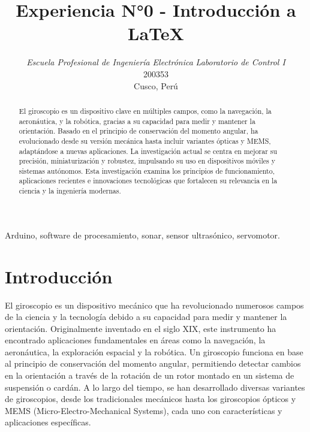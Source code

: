 \documentclass[conference]{IEEEtran}
\begin{document}
\title{Experiencia N°0 - Introducción a \LaTeX}
\author{
\textit{Escuela Profesional de Ingeniería Electrónica}
\textit{Laboratorio de Control I}\\
200353 \\
Cusco, Perú}

\maketitle

\begin{abstract}
El giroscopio es un dispositivo clave en múltiples campos, como la navegación, la aeronáutica, y la robótica, gracias a su capacidad para medir y mantener la orientación. Basado en el principio de conservación del momento angular, ha evolucionado desde su versión mecánica hasta incluir variantes ópticas y MEMS, adaptándose a nuevas aplicaciones. La investigación actual se centra en mejorar su precisión, miniaturización y robustez, impulsando su uso en dispositivos móviles y sistemas autónomos. Esta investigación examina los principios de funcionamiento, aplicaciones recientes e innovaciones tecnológicas que fortalecen su relevancia en la ciencia y la ingeniería modernas.
\end{abstract}

\begin{IEEEkeywords}
Arduino, software de procesamiento, sonar, sensor ultrasónico, servomotor.
\end{IEEEkeywords}

\section{Introducción}
El giroscopio es un dispositivo mecánico que ha revolucionado numerosos campos de la ciencia y la tecnología debido a su capacidad para medir y mantener la orientación. Originalmente inventado en el siglo XIX, este instrumento ha encontrado aplicaciones fundamentales en áreas como la navegación, la aeronáutica, la exploración espacial y la robótica. Un giroscopio funciona en base al principio de conservación del momento angular, permitiendo detectar cambios en la orientación a través de la rotación de un rotor montado en un sistema de suspensión o cardán. A lo largo del tiempo, se han desarrollado diversas variantes de giroscopios, desde los tradicionales mecánicos hasta los giroscopios ópticos y MEMS (Micro-Electro-Mechanical Systems), cada uno con características y aplicaciones específicas. \cite{ecolocalizacion}
\end{document}
